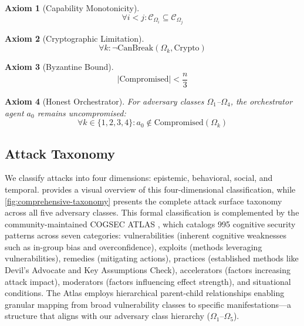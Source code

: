 \documentclass[
]{article}
\newtheorem{axiom}{Axiom}[section]
\begin{document}
\begin{axiom}[Capability Monotonicity]
\label{ax:capability-mono}
\begin{equation}
\label{eq:capability-mono}
\forall i < j: \mathcal{C}_{\Omega_i} \subseteq \mathcal{C}_{\Omega_j}
\end{equation}
\end{axiom}

\begin{axiom}[Cryptographic Limitation]
\label{ax:crypto-limit}
\begin{equation}
\label{eq:crypto-limit}
\forall k: \neg \text{CanBreak}(\Omega_k, \text{Crypto})
\end{equation}
\end{axiom}

\begin{axiom}[Byzantine Bound]
\label{ax:byzantine}
\begin{equation}
\label{eq:byzantine-bound}
|\text{Compromised}| < \frac{n}{3}
\end{equation}
\end{axiom}

\begin{axiom}[Honest Orchestrator]
\label{ax:honest-orchestrator}
For adversary classes $\Omega_1$--$\Omega_4$, the orchestrator agent $a_0$ remains uncompromised:
\begin{equation}
\label{eq:honest-orchestrator}
\forall k \in \{1,2,3,4\}: a_0 \notin \text{Compromised}(\Omega_k)
\end{equation}
\end{axiom}

\subsection{Attack Taxonomy}\label{sec:attack-taxonomy}

We classify attacks into four dimensions: epistemic, behavioral, social,
and temporal.  provides a visual overview of
this four-dimensional classification, while
\cref{fig:comprehensive-taxonomy} presents the complete attack surface
taxonomy across all five adversary classes. This formal classification
is complemented by the community-maintained COGSEC ATLAS
\cite{cogsecatlas2023}, which catalogs 995 cognitive security patterns
across seven categories: vulnerabilities (inherent cognitive weaknesses
such as in-group bias and overconfidence), exploits (methods leveraging
vulnerabilities), remedies (mitigating actions), practices (established
methods like Devil's Advocate and Key Assumptions Check), accelerators
(factors increasing attack impact), moderators (factors influencing
effect strength), and situational conditions. The Atlas employs
hierarchical parent-child relationships enabling granular mapping from
broad vulnerability classes to specific manifestations---a structure
that aligns with our adversary class hierarchy
(\(\Omega_1\)--\(\Omega_5\)).
\end{document}
